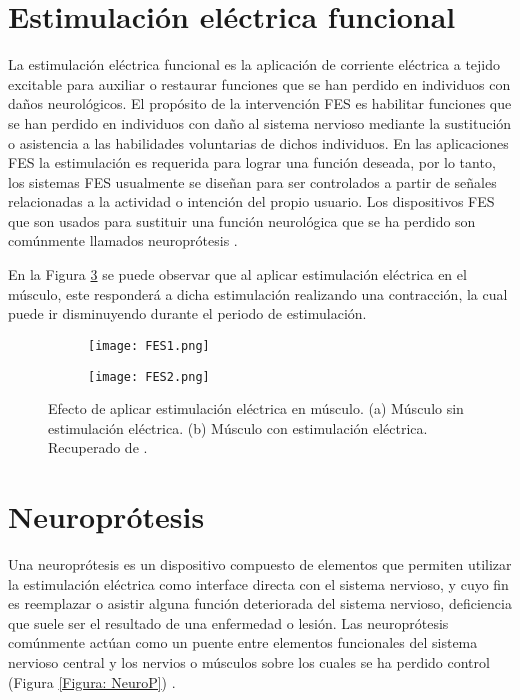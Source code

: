 
\section{Estimulación eléctrica funcional}
La estimulación eléctrica funcional es la aplicación de corriente eléctrica a tejido excitable para auxiliar o restaurar funciones que se han perdido en individuos con daños neurológicos. El propósito de la intervención FES es habilitar funciones que se han perdido en individuos con daño al sistema nervioso mediante la sustitución o asistencia a las habilidades voluntarias de dichos individuos. En las aplicaciones FES la estimulación es requerida para lograr una función deseada, por lo tanto, los sistemas FES usualmente se diseñan para ser controlados a partir de señales relacionadas a la actividad o intención del propio usuario. Los dispositivos FES que son usados para sustituir una función neurológica que se ha perdido son comúnmente llamados neuroprótesis \cite{Peckham2005}.

En la Figura \ref{Figura: FES} se puede observar que al aplicar estimulación eléctrica en el músculo, este responderá a dicha estimulación realizando una contracción, la cual puede ir disminuyendo durante el periodo de estimulación.

\begin{figure}[htbp]
	\centering
	\begin{subfigure}[htbp]{0.4\textwidth}
		\centering
		\texttt{[image: FES1.png]}
		\caption{}
		\label{Figura: FES1}
	\end{subfigure}
	\hfill
	\begin{subfigure}[htbp]{0.4\textwidth}
		\centering
		\texttt{[image: FES2.png]}
		\caption{}
		\label{Figura: FES2}
	\end{subfigure}
	\caption[Efecto de aplicar estimulación eléctrica en músculo]{Efecto de aplicar estimulación eléctrica en músculo. (a) Músculo sin estimulación eléctrica. (b) Músculo con estimulación eléctrica. Recuperado de \cite{HASOMED}.}
	\label{Figura: FES}
\end{figure}

\section{Neuroprótesis}
Una neuroprótesis es un dispositivo compuesto de elementos que permiten utilizar la estimulación eléctrica como interface directa con el sistema nervioso, y cuyo fin es reemplazar o asistir alguna función deteriorada del sistema nervioso, deficiencia que suele ser el resultado de una enfermedad o lesión. Las neuroprótesis comúnmente actúan como un puente entre elementos funcionales del sistema nervioso central y los nervios o músculos sobre los cuales se ha perdido control (Figura \ref{Figura: NeuroP}) \cite{Finn2003}\cite{Popovic2008}.

